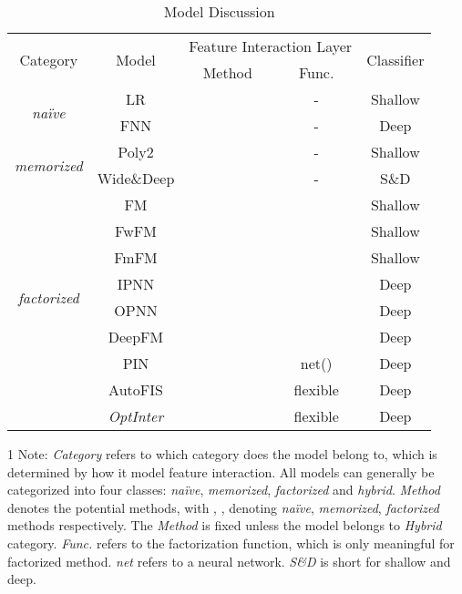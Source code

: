 \documentclass[conference]{IEEEtran}
\begin{document}
\begin{table}[!htbp]
    \renewcommand\arraystretch{1.00}
    \centering
    \caption{Model Discussion}
    \begin{tabular}{c|c|c|c|c}
    \hline
        \multirow{2}{*}{Category} & \multirow{2}{*}{Model} & \multicolumn{2}{|c|}{Feature Interaction Layer} & \multirow{2}{*}{Classifier} \\
        \cline{3-4}
        & & Method & Func. \\
    \hline
        \multirow{2}{*}{\emph{naïve}} 
        & LR\cite{LR} &  & - & Shallow \\
        & FNN\cite{FNN} &  & - & Deep \\
    \hline
        \multirow{2}{*}{\emph{memorized}} 
        & Poly2\cite{Poly-2} &   & - & Shallow \\
        & Wide\&Deep\cite{Wide_Deep} &  & - & S\&D \\
    \hline
        \multirow{8}{*}{\emph{factorized}}
        & FM\cite{FM} &  &  & Shallow \\
        & FwFM\cite{FwFM} &  &  & Shallow \\
        & FmFM\cite{FM2} &  &  & Shallow \\
        & IPNN\cite{PNN16} &  &  & Deep \\
        & OPNN\cite{PNN16} &  &  & Deep \\
        & DeepFM\cite{DeepFM} &  &  & Deep \\
        & PIN\cite{PNN19} &  & net() & Deep \\
\hline
        \multirow{2}{*}{\emph{hybrid}}
        & AutoFIS\cite{AutoFis} &  & flexible & Deep \\
        & \textit{OptInter} &  & flexible & Deep \\
    \hline
    \end{tabular}
    \begin{tablenotes}
    \footnotesize
    \item[1] Note: \textit{Category} refers to which category does the model belong to, which is determined by how it model feature interaction. All models can generally be categorized into four classes: \emph{naïve}, \emph{memorized}, \emph{factorized} and \emph{hybrid}. \textit{Method} denotes the potential methods, with , ,  denoting \emph{naïve}, \emph{memorized}, \emph{factorized} methods respectively. The \textit{Method} is fixed unless the model belongs to \emph{Hybrid} category. \textit{Func.} refers to the factorization function, which is only meaningful for factorized method. \textit{net} refers to a neural network. \textit{S\&D} is short for shallow and deep.
    \end{tablenotes}
    \label{table:model_discussion}
\end{table}
\end{document}
